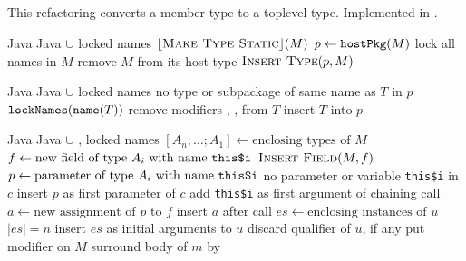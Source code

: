 \subsection{}
This refactoring converts a member type to a toplevel type. Implemented in .

\begin{algorithm}
\caption{$\refactoring{Move Member Type to Toplevel}(M : \type{MemberType})$}
\label{alg:MoveMemberTypeToToplevel}
\begin{algorithmic}[1]
\REQUIRE Java
\ENSURE Java $\cup$ locked names
\medskip
{}
  \STATE $\lfloor\textsc{Make Type Static}\rfloor(M)$
\ENDIF
\STATE $p \leftarrow \text{\texttt{hostPkg}}(M)$
\STATE lock all names in $M$
\STATE remove $M$ from its host type
\STATE $\textsc{Insert Type}(p, M)$
\end{algorithmic}
\end{algorithm}

\begin{algorithm}
\caption{$\refactoring{Insert Type}(p : \type{Package}, T : \type{ClassOrInterface})$}
\label{alg:InsertType}
\begin{algorithmic}[1]
\REQUIRE Java
\ENSURE Java $\cup$ locked names
\medskip
\STATE \assert no type or subpackage of same name as $T$ in $p$
\STATE $\text{\texttt{lockNames}}(\text{\texttt{name}}(T))$
\STATE remove modifiers , ,  from $T$
\STATE insert $T$ into $p$
\end{algorithmic}
\end{algorithm}

\begin{algorithm}
\caption{$\refactoring{Make Type Static}(M : \type{MemberType})$}
\label{alg:MakeTypeStatic}
\begin{algorithmic}[1]
\REQUIRE Java
\ENSURE Java $\cup$ , locked names
\medskip
\STATE $[A_n;\ldots;A_1] \leftarrow \text{enclosing types of $M$}$
  \STATE $f \leftarrow \text{new field of type $A_i$ with name \texttt{this\$i}}$
  \STATE $\textsc{Insert Field}(M, f)$
    \STATE $p \leftarrow \text{parameter of type $A_i$ with name \texttt{this\$i}}$
    \STATE \assert no parameter or variable \texttt{this\$i} in $c$
    \STATE insert $p$ as first parameter of $c$
      \STATE add \texttt{this\$i} as first argument of chaining call
    \ELSE
      \STATE $a \leftarrow \text{new assignment of $p$ to $f$}$
      \STATE insert $a$ after  call
    \ENDIF
  \ENDFOR
\ENDFOR
{}
    \STATE $es \leftarrow \text{enclosing instances of $u$}$
    \STATE \assert $|es|=n$
    \STATE insert $es$ as initial arguments to $u$
    \STATE discard qualifier of $u$, if any
  \ENDFOR
\ENDFOR
\STATE put modifier  on $M$
    \STATE surround body of $m$ by\\
  \ENDIF
\ENDFOR
\end{algorithmic}
\end{algorithm}
